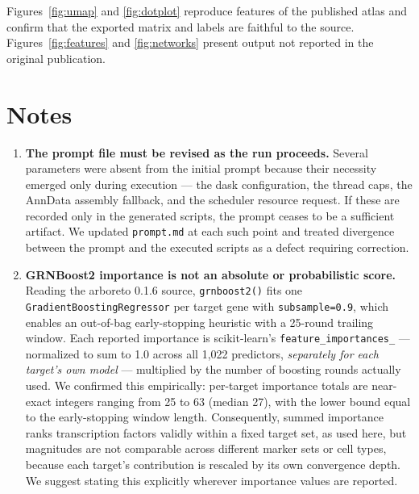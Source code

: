 Figures~\ref{fig:umap} and \ref{fig:dotplot} reproduce features of the published atlas \cite{baumgart2025} and confirm that the exported matrix and labels are faithful to the source. Figures~\ref{fig:features} and \ref{fig:networks} present output not reported in the original publication.

\section{Notes}

\begin{enumerate}[leftmargin=*]


\item \textbf{The prompt file must be revised as the run proceeds.} Several parameters were absent from the initial prompt because their necessity emerged only during execution --- the dask configuration, the thread caps, the AnnData assembly fallback, and the scheduler resource request. If these are recorded only in the generated scripts, the prompt ceases to be a sufficient artifact. We updated \texttt{prompt.md} at each such point and treated divergence between the prompt and the executed scripts as a defect requiring correction.

\item \textbf{GRNBoost2 importance is not an absolute or probabilistic score.} Reading the arboreto 0.1.6 source, \texttt{grnboost2()} fits one \texttt{GradientBoostingRegressor} per target gene with \texttt{subsample=0.9}, which enables an out-of-bag early-stopping heuristic with a 25-round trailing window. Each reported importance is scikit-learn's \texttt{feature\_importances\_} --- normalized to sum to 1.0 across all 1,022 predictors, \textit{separately for each target's own model} --- multiplied by the number of boosting rounds actually used. We confirmed this empirically: per-target importance totals are near-exact integers ranging from 25 to 63 (median 27), with the lower bound equal to the early-stopping window length. Consequently, summed importance ranks transcription factors validly within a fixed target set, as used here, but magnitudes are not comparable across different marker sets or cell types, because each target's contribution is rescaled by its own convergence depth. We suggest stating this explicitly wherever importance values are reported.


\end{enumerate}
